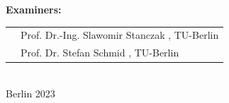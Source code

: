 \begin{titlepage}
\begin{center}
    \vspace{1cm}

    \large \textbf{Examiners:}

    \vspace{.2cm}

		\begin{tabular}{rl}
		&Prof. Dr.-Ing. Slawomir Stanczak
, TU-Berlin\\
		&Prof. Dr. Stefan Schmid
, TU-Berlin\\
		\end{tabular}\\

    \vspace{2cm}
    \vspace{0.5cm}
    \large Berlin 2023\\


  \end{center}


\end{titlepage}

